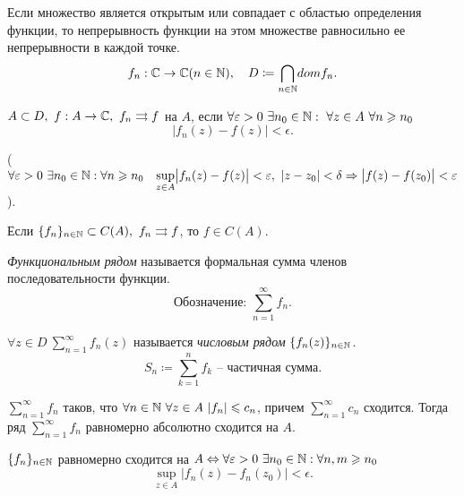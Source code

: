 \begin{remark}
    Если множество является открытым или совпадает с областью определения функции, то непрерывность функции на этом множестве равносильно ее непрерывности в каждой точке.
    \[
        f_n: \mathbb{C} \rightarrow \mathbb{C} (n \in \mathbb{N}), \quad D \coloneqq \underset{n \in \mathbb{N}}{\bigcap} dom f_n.
    \]
\end{remark}

\begin{definition}
    $ A \subset D, \ f : A \rightarrow \Comp, \ f_n \rightrightarrows f $ на $ A $, если $ \forall \varepsilon > 0 \ \exists n_0 \in \mathbb{N} : \ \forall z \in A \ \forall n \geqslant n_0 $
    \[
        \big|f_n(z) - f(z)\big| < \epsilon.
    \]

    ($ \forall \varepsilon > 0 \ \exists n_0 \in \mathbb{N}:  \forall n \geqslant n_0 \quad \underset{z \in A}{\sup} \big| f_n(z) - f(z) \big| < \varepsilon, \ | z - z_0 | < \delta \Rightarrow \big| f(z) - f(z_0) \big| < \varepsilon $).
\end{definition}

\begin{theorem}[Вейерштрасса]
    Если $ \{f_n\}_{n\in\mathbb{N}} \subset C(A), \ f_n \rightrightarrows f $, то $ f \in C(A) $.
\end{theorem}

\begin{definition}
    \emph{Функциональным рядом} называется формальная сумма членов последовательности функции.
    \[
        \text{Обозначение: } \sum_{n=1}^{\infty}f_n.
    \]
\end{definition}

\begin{definition}
    $ \forall z \in D \ \sum_{n=1}^{\infty}f_n(z) $ называется \emph{числовым рядом} $ \{f_n(z)\}_{n \in \mathbb{N}} $.
    \[
        S_n \coloneqq \sum_{k=1}^{n}f_k \text{ -- частичная сумма}.
    \]
\end{definition}

\begin{theorem}
    $ \sum_{n=1}^{\infty}f_n $ таков, что $ \forall n \in \mathbb{N} \ \forall z \in A \ | f_n | \leqslant c_n $, причем $ \sum_{n=1}^{\infty} c_n $ сходится. Тогда ряд $ \sum_{n=1}^{\infty} f_n $ равномерно абсолютно сходится на $ A $.
\end{theorem}

\begin{theorem}
    $ \{f_n\}_{n\in\mathbb{N}} $ равномерно сходится на $ A \iff \forall \epsilon > 0 \ \exists n_0 \in \N: \forall n,m \geqslant n_0 $
    \[
        \underset{z \in A}{\sup}\big|f_n(z) - f_n(z_0)\big| < \epsilon.
    \]
\end{theorem}

